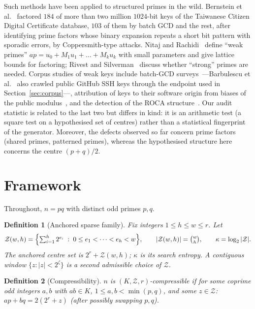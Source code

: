 \documentclass[11pt,a4paper]{article}
\newtheorem{definition}{Definition}[section]
\begin{document}
Such methods have been applied to structured primes in the wild. Bernstein et al.~\cite{bernstein} factored $184$ of more than two million $1024$-bit keys of the Taiwanese Citizen Digital Certificate database, $103$ of them by batch GCD and the rest, after identifying prime factors whose binary expansion repeats a short bit pattern with sporadic errors, by Coppersmith-type attacks. Nitaj and Rachidi~\cite{nitaj} define ``weak primes'' $ap=u_0+M_1u_1+\dots+M_ku_k$ with small parameters and give lattice bounds for factoring; Rivest and Silverman~\cite{rivest} discuss whether ``strong'' primes are needed. Corpus studies of weak keys include batch-GCD surveys~\cite{heninger,lenstra,hastings,barbulescu}---Barbulescu et al.~\cite{barbulescu} also crawled public GitHub SSH keys through the endpoint used in Section~\ref{sec:corpus}---, attribution of keys to their software origin from biases of the public modulus~\cite{svenda}, and the detection of the ROCA structure~\cite{nemec}. Our audit statistic is related to the last two but differs in kind: it is an arithmetic test (a square test on a hypothesised set of centres) rather than a statistical fingerprint of the generator. Moreover, the defects observed so far concern prime factors (shared primes, patterned primes), whereas the hypothesised structure here concerns the centre $(p+q)/2$.

\section{Framework}\label{sec:framework}
Throughout, $n=pq$ with distinct odd primes $p,q$.

\begin{definition}[Anchored sparse family]
Fix integers $1\le h\le w\le r$. Let
\[
\mathcal Z(w,h)=\Bigl\{\textstyle\sum_{i=1}^h 2^{e_i}\;:\;0\le e_1<\dots<e_h<w\Bigr\},\qquad |\mathcal Z(w,h)|=\binom wh,\qquad \kappa=\log_2|\mathcal Z|.
\]
The \emph{anchored centre set} is $2^r+\mathcal Z(w,h)$; $\kappa$ is its search entropy. A contiguous window $\{z:|z|<2^{\zeta}\}$ is a second admissible choice of $\mathcal Z$.
\end{definition}

\begin{definition}[Compressibility]
$n$ is \emph{$(K,\mathcal Z,r)$-compressible} if for some coprime odd integers $a,b$ with $ab\in K$, $1\le a,b<\min(p,q)$, and some $z\in\mathcal Z$: $ap+bq=2(2^r+z)$ (after possibly swapping $p,q$).
\end{definition}
\end{document}
